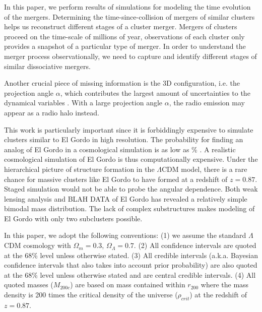 In this paper, we perform results of simulations for modeling the time
evolution of the mergers. 
Determining the time-since-collision of mergers of similar clusters helps
us reconstruct different stages of a cluster merger.
Mergers of clusters proceed on the time-scale of millions of year,
observations of each cluster only provides a snapshot of a particular type
of merger. In order to understand the merger process observationally, 
we need to capture
and identify different stages of similar dissociative mergers. \par 

Another crucial piece of missing information is the 3D
configuration, i.e. the projection angle $\alpha$, which contributes the
largest amount of uncertainties to the dynamical variables \citep{D13}.
With a large projection angle $\alpha$, the radio emission may appear as a
radio halo instead.  \citep{S13}\par 
This work is particularly important since it is forbiddingly
expensive to simulate clusters similar to El Gordo in high resolution. 
The probability for finding an analog of El Gordo in a cosmological
simulation is as low as \% . A realistic cosmological simulation of
El Gordo is thus computationally expensive. Under the hierarchical picture
of structure formation in the $\Lambda$CDM model, there is a rare
chance for massive clusters like El Gordo to have formed at a redshift of
$z = 0.87$.  Staged simulation would not be able to probe the angular
dependence. 
Both weak lensing analysis and BLAH DATA of El Gordo \citep{Jee13} has revealed a
relatively simple bimodal mass distribution.  The lack of complex
substructures makes modeling of El Gordo with only two subclusters possible.

\par

In this paper, we adopt the following conventions: (1) we
assume the standard $\Lambda$CDM cosmology with $\Omega_{m} = 0.3$, $\Omega_{\Lambda} = 0.7$. (2) All confidence intervals are quoted at the 68\% level unless otherwise stated. 
(3) All credible intervals (a.k.a. Bayesian confidence intervals that also
takes into account prior probability) are also
quoted at the 68\% level unless otherwise stated and are central credible
intervals. (4) All quoted masses ($M_{200c}$) are based on mass contained
within $r_{200}$ where the mass density is 200 times the critical density
of the universe ($\rho_{crit}$) at the redshift of $z = 0.87$. 
